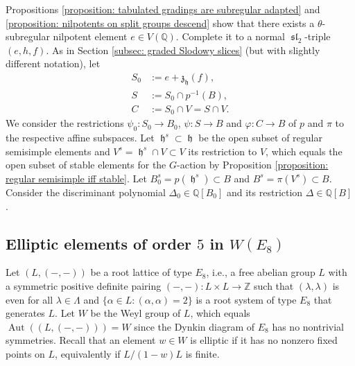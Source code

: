 \documentclass{article} %
\numberwithin{equation}{section}
\theoremstyle{definition}
\DeclareMathOperator{\liesl}{\mathfrak{sl}}
\DeclareMathOperator{\lieh}{\mathfrak{h}}
\DeclareMathOperator{\Aut}{Aut}
\newcommand{\Q}{\mathbb{Q}}
\newcommand{\Z}{\mathbb{Z}}
\newcommand{\frakh}{\mathfrak h}
\newcommand{\frakz}{\mathfrak z}
\begin{document}
Propositions \ref{proposition: tabulated gradings are subregular adapted} and \ref{proposition: nilpotents on split groups descend} show that there exists a $\theta$-subregular nilpotent element $e\in V(\Q)$.
Complete it to a normal $\liesl_2$-triple $(e,h,f)$.
As in Section \ref{subsec: graded Slodowy slices} (but with slightly different notation), let
\begin{align*}
    S_0 &:= e + \frakz_{\frakh}(f), \\
    S &:= S_0 \cap p^{-1}(B), \\
    C &:= S_0 \cap V = S \cap V.
\end{align*}
We consider the restrictions $\psi_0 \colon S_0\rightarrow B_0$, $\psi\colon S\rightarrow B$ and $\varphi\colon C\rightarrow B$ of $p$ and $\pi$ to the respective affine subspaces.
Let $\lieh^s\subset \lieh$ be the open subset of regular semisimple elements and $V^s = \lieh^s\cap V\subset V$ its restriction to $V$, which equals the open subset of stable elements for the $G$-action by Proposition \ref{proposition: regular semisimple iff stable}.
Let $B_0^s = p(\lieh^s)\subset B$ and $B^s =\pi(V^s)\subset B$.
Consider the discriminant polynomial $\Delta_0\in \Q[B_0]$ and its restriction $\Delta \in \Q[B]$. 

\subsection{Elliptic elements of order $5$ in $W(E_8)$}


Let $(L,(-,-))$ be a root lattice of type $E_8$, i.e., a free abelian group $L$ with a symmetric positive definite pairing $(-,-)\colon L\times L\rightarrow \Z$ such that $(\lambda, \lambda)$ is even for all $\lambda \in \Lambda$ and $\{\alpha\in L\colon (\alpha, \alpha)=2\}$ is a root system of type $E_8$ that generates $L$.
Let $W$ be the Weyl group of $L$, which equals $\Aut((L,(-,-))) = W$ since the Dynkin diagram of $E_8$ has no nontrivial symmetries.
Recall that an element $w\in W$ is elliptic if it has no nonzero fixed points on $L$, equivalently if $L/(1-w)L$ is finite.
\end{document}
